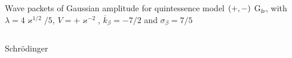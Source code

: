 \documentclass[9pt]{beamer}
\begin{document}
\begin{frame}%
{Wave packets of Gaussian amplitude for quintessence model ${\left(+,-\right)}$}%
{$\mathrm{G}_{\ii\nu}$, with $\lambda = 4\varkappa^{1/2}/5$,
$V = +\varkappa^{-2}$, $\overline{k}_\beta = -7/2$ and $\sigma_\beta = 7/5$}
\begin{columns}
\begin{column}{.49\textwidth}
\begin{block}{Schrödinger}

\end{block}
\end{column}
\end{columns}
\end{frame}
\end{document}
